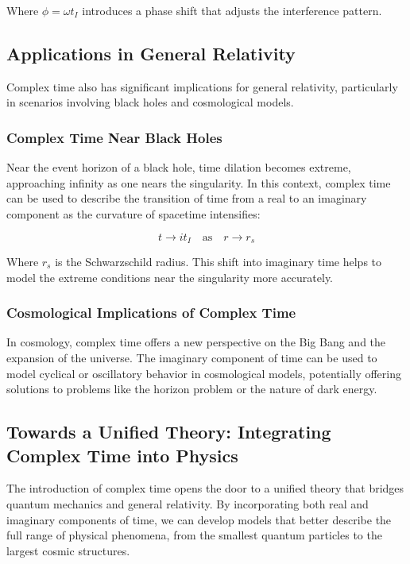 \documentclass{article}
\begin{document}
Where \( \phi = \omega t_I \) introduces a phase shift that adjusts the interference pattern.

\subsection{Applications in General Relativity}

Complex time also has significant implications for general relativity, particularly in scenarios involving black holes and cosmological models.

\subsubsection{Complex Time Near Black Holes}

Near the event horizon of a black hole, time dilation becomes extreme, approaching infinity as one nears the singularity. In this context, complex time can be used to describe the transition of time from a real to an imaginary component as the curvature of spacetime intensifies:

\[
t \rightarrow i t_I \quad \text{as} \quad r \rightarrow r_s
\]

Where \( r_s \) is the Schwarzschild radius. This shift into imaginary time helps to model the extreme conditions near the singularity more accurately.

\subsubsection{Cosmological Implications of Complex Time}

In cosmology, complex time offers a new perspective on the Big Bang and the expansion of the universe. The imaginary component of time can be used to model cyclical or oscillatory behavior in cosmological models, potentially offering solutions to problems like the horizon problem or the nature of dark energy.

\subsection{Towards a Unified Theory: Integrating Complex Time into Physics}

The introduction of complex time opens the door to a unified theory that bridges quantum mechanics and general relativity. By incorporating both real and imaginary components of time, we can develop models that better describe the full range of physical phenomena, from the smallest quantum particles to the largest cosmic structures.
\end{document}
